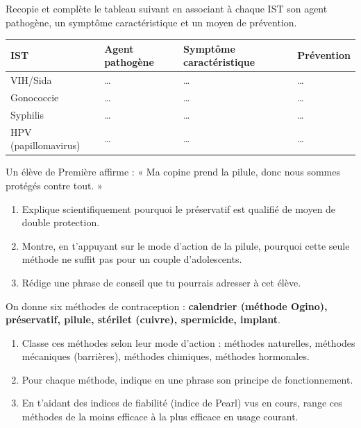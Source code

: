 \documentclass[11pt]{article}
\newcommand{\cle}[1]{{\popxbold\color{popdark}#1}}
\begin{document}
\begin{exercice}
Recopie et complète le tableau suivant en associant à chaque IST son agent pathogène, un symptôme caractéristique et un moyen de prévention.

\begin{center}
\begin{tabularx}{\linewidth}{|l|X|X|X|}
\hline
\rowcolor{popblueL} \textbf{IST} & \textbf{Agent pathogène} & \textbf{Symptôme caractéristique} & \textbf{Prévention} \\
\hline
VIH/Sida & \dots & \dots & \dots \\
\hline
Gonococcie & \dots & \dots & \dots \\
\hline
Syphilis & \dots & \dots & \dots \\
\hline
HPV (papillomavirus) & \dots & \dots & \dots \\
\hline
\end{tabularx}
\end{center}
\end{exercice}

\begin{exercice}
Un élève de Première affirme : « Ma copine prend la pilule, donc nous sommes protégés contre tout. »
\begin{enumerate}
\item Explique scientifiquement pourquoi le préservatif est qualifié de moyen de \cle{double protection}.
\item Montre, en t'appuyant sur le mode d'action de la pilule, pourquoi cette seule méthode ne suffit pas pour un couple d'adolescents.
\item Rédige une phrase de conseil que tu pourrais adresser à cet élève.
\end{enumerate}
\end{exercice}

\begin{exercice}
On donne six méthodes de contraception : \textbf{calendrier (méthode Ogino), préservatif, pilule, stérilet (cuivre), spermicide, implant}.
\begin{enumerate}
\item Classe ces méthodes selon leur mode d'action : méthodes \cle{naturelles}, méthodes \cle{mécaniques (barrières)}, méthodes \cle{chimiques}, méthodes \cle{hormonales}.
\item Pour chaque méthode, indique en une phrase son principe de fonctionnement.
\item En t'aidant des indices de fiabilité (indice de Pearl) vus en cours, range ces méthodes de la moins efficace à la plus efficace en usage courant.
\end{enumerate}
\end{exercice}
\end{document}
